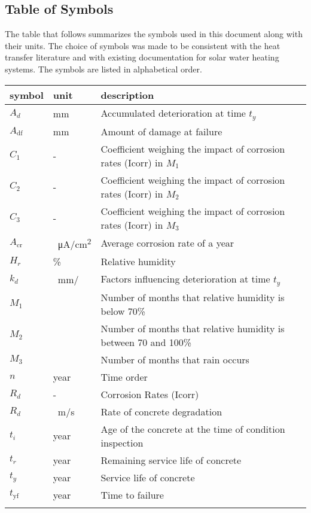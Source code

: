 \documentclass[12pt]{article}
\begin{document}
\subsection{Table of Symbols}

The table that follows summarizes the symbols used in this document along with
their units.  The choice of symbols was made to be consistent with the heat
transfer literature and with existing documentation for solar water heating
systems.  The symbols are listed in alphabetical order.

\renewcommand{\arraystretch}{1.2}
\noindent \begin{longtable*}{l l p{12cm}} \toprule
\textbf{symbol} & \textbf{unit} & \textbf{description}\\
\midrule 
$A_d$ & \si[per-mode=symbol] {\milli\meter} & Accumulated deterioration at time $t_y$ \\
$A_\text{df}$ & \si[per-mode=symbol] {\milli\meter} & Amount of damage at failure \\
$C_1$ & - & Coefficient weighing the impact of corrosion rates (Icorr) in $M_1$\\
$C_2$ & - & Coefficient weighing the impact of corrosion rates (Icorr) in $M_2$\\
$C_3$ & - & Coefficient weighing the impact of corrosion rates (Icorr) in $M_3$\\

$A_\text{cr}$ & \si[per-mode=symbol]{{}\micro\ampere\per\centi\meter\squared}& Average corrosion rate of a year \\

$H_r$ & \% & Relative humidity\\

$k_d$ & \si[per-mode=symbol]{{}\milli\meter\per{}} & Factors influencing deterioration at time $t_y$ \\

$M_1$ & \SI{}{} & Number of months that relative humidity is below 70\%\\
$M_2$ & \SI{}{} & Number of months that relative humidity is between 70 and 100\% \\
$M_3$ & \SI{}{} & Number of months that rain occurs\\

$n$ & year & Time order \\

$R_d$ & - & Corrosion Rates (Icorr)\\
$R_d$ & \si[per-mode=symbol]{{}\meter\per\second} & Rate of concrete degradation \\

$t_i$ & year & Age of the concrete at the time of condition inspection\\
$t_r$ & year & Remaining service life of concrete\\
$t_y$ & year & Service life of concrete\\
$t_\text{yf}$ & year & Time to failure\\

\\ 
\bottomrule
\end{longtable*}
\end{document}
